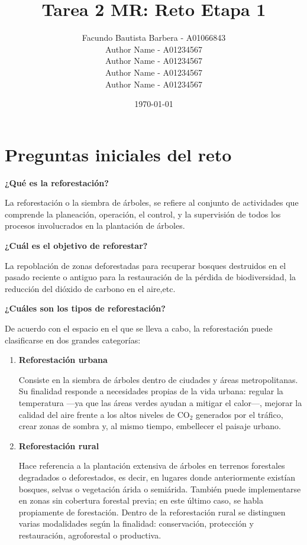 \documentclass{article}
\title{Tarea 2 MR: Reto Etapa 1}
\author{
	Facundo Bautista Barbera - A01066843 \\
	Author Name - A01234567 \\
	Author Name - A01234567 \\
	Author Name - A01234567 \\
	Author Name - A01234567
}
\date{\today}
\newenvironment{question}[1]
{\par\vspace{10pt}\noindent\textbf{#1}\par\noindent\vspace{3pt}}
{\par\vspace{5pt}}
\begin{document}
\maketitle

\section*{Preguntas iniciales del reto}

\begin{question}{¿Qué es la reforestación?}
	La reforestación o la siembra de árboles, se refiere al conjunto de actividades que comprende la planeación, operación, el control, y la supervisión de todos los procesos involucrados en la plantación de árboles.
\end{question}

\begin{question}{¿Cuál es el objetivo de reforestar?}
	La repoblación de zonas deforestadas para recuperar bosques destruidos en el pasado reciente o antiguo para la restauración de la pérdida de biodiversidad, la reducción del dióxido de carbono en el aire,etc.
\end{question}

\begin{question}{¿Cuáles son los tipos de reforestación?}
	De acuerdo con el espacio en el que se lleva a cabo, la reforestación puede clasificarse en dos grandes categorías:

	\begin{enumerate}
		\item \textbf{Reforestación urbana}

		      Consiste en la siembra de árboles dentro de ciudades y áreas metropolitanas. Su finalidad responde a necesidades propias de la vida urbana: regular la temperatura ---ya que las áreas verdes ayudan a mitigar el calor---, mejorar la calidad del aire frente a los altos niveles de CO$_2$ generados por el tráfico, crear zonas de sombra y, al mismo tiempo, embellecer el paisaje urbano.

		\item \textbf{Reforestación rural}

		      Hace referencia a la plantación extensiva de árboles en terrenos forestales degradados o deforestados, es decir, en lugares donde anteriormente existían bosques, selvas o vegetación árida o semiárida. También puede implementarse en zonas sin cobertura forestal previa; en este último caso, se habla propiamente de forestación. Dentro de la reforestación rural se distinguen varias modalidades según la finalidad: conservación, protección y restauración, agroforestal o productiva.
	\end{enumerate}
\end{question}
\end{document}
